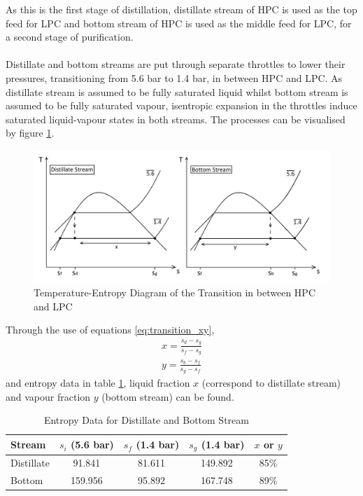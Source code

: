         As this is the first stage of distillation, distillate stream of HPC is used as the top feed for LPC and bottom stream of HPC is used as the middle feed for LPC, for a second stage of purification.\\
        \\
        Distillate and bottom streams are put through separate throttles to lower their pressures, transitioning from 5.6 bar to 1.4 bar, in between HPC and LPC. As distillate stream is assumed to be fully saturated liquid whilst bottom stream is assumed to be fully saturated vapour, isentropic expansion in the throttles induce saturated liquid-vapour states in both streams. The processes can be visualised by figure \ref{transition_T-S_diagram}. \\
        \begin{figure}[H]
            \centering
	        \includegraphics[width=1.00\linewidth]{transition_T-S_diagram.jpg}
	        \caption{Temperature-Entropy Diagram of the Transition in between HPC and LPC}
	        \label{transition_T-S_diagram}
        \end{figure} 
        \noindent Through the use of equations \ref{eq:transition_xy},
        \begin{equation}
            \begin{aligned}
                x = \frac{s_d-s_g}{s_f-s_g} \\
                y = \frac{s_b-s_f}{s_g-s_f}
            \end{aligned}
            \label{eq:transition_xy}
        \end{equation}
        and entropy data in table \ref{table:transition_entropy}, liquid fraction $x$ (correspond to distillate stream) and vapour fraction $y$ (bottom stream) can be found. \\
        \begin{table}[H]
        \centering
            \singlespacing
	        \caption{Entropy Data for Distillate and Bottom Stream}
	        \label{table:transition_entropy}
	
	        \begin{tabular}{|l|c|cc|c|}
	        \hline
	        Stream      	& $s_i$ (5.6 bar)   & $s_f$ (1.4 bar)   & $s_g$ (1.4 bar)   & $x$ or $y$     \\
	        \hline
	        Distillate		& 91.841			& 81.611            & 149.892           & 85\% \\
	        Bottom			& 159.956   	    & 95.892            & 167.748           & 89\% \\
	        \hline
	        \end{tabular}
        \end{table}
